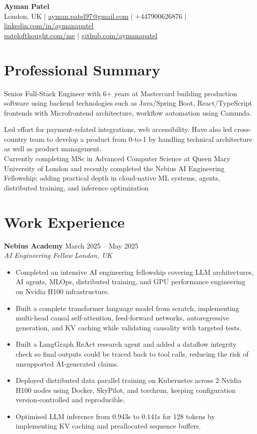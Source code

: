 \documentclass[a4paper,10pt]{article}
\newcommand{\role}[4]{
  \textbf{\color{accent}#1} \hfill {\small #2}\\
  \textit{#3} \hfill {\small \textit{#4}}
}
\begin{document}
\begin{center}
  {\LARGE \textbf{Ayman Patel}}\\
  \vspace{2pt}
  London, UK \quad | \quad
  \href{mailto:ayman.patel97@gmail.com}{ayman.patel97@gmail.com} \quad | \quad
  +447900626876 \quad | \quad
  \href{https://linkedin.com/in/aymanapatel}{linkedin.com/in/aymanapatel}\\
  \href{https://patelofthought.com/me}{patelofthought.com/me} \quad | \quad
  \href{https://github.com/aymanapatel}{github.com/aymanapatel}
\end{center}

\section{Professional Summary}
{\small
Senior Full-Stack Engineer with 6+ years at Mastercard building production software using backend technologies such as Java/Spring Boot, React/TypeScript frontends with Microfrontend architecture, workflow automation using Camunda.

Led effort for payment-related integrations, web accessibility.
Have also led cross-country team to develop a product from 0-to-1 by handling technical architecture as well as product management.
\\
Currently completing MSc in Advanced Computer Science at Queen Mary University of London and recently completed the Nebius AI
Engineering Fellowship; adding practical depth in cloud-native ML systems, agents, distributed training, and inference
optimization
}


\section{Work Experience}
\role{Nebius Academy}{March 2025 -- May 2025}{AI Engineering Fellow}{London, UK}
\begin{itemize}
  \item Completed an intensive AI engineering fellowship covering LLM architectures, AI agents, MLOps, distributed training, and GPU performance engineering on Nvidia H100 infrastructure.
  \item Built a complete transformer language model from scratch, implementing multi-head causal self-attention, feed-forward networks, autoregressive generation, and KV caching while validating causality with targeted tests.
  \item Built a LangGraph ReAct research agent and added a dataflow integrity check so final outputs could be traced back to tool calls, reducing the risk of unsupported AI-generated claims.
  \item Deployed distributed data parallel training on Kubernetes across 2 Nvidia H100 nodes using Docker, SkyPilot, and torchrun, keeping configuration version-controlled and reproducible.
  \item Optimised LLM inference from 0.943s to 0.141s for 128 tokens by implementing KV caching and preallocated sequence buffers.
\end{itemize}
\end{document}
